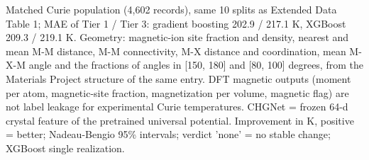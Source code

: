 \begin{table}
\par\vspace{4pt}\raggedright\noindent Matched Curie population (4,602 records), same 10 splits as Extended Data Table 1; MAE of Tier 1 / Tier 3: gradient boosting 202.9 / 217.1 K, XGBoost 209.3 / 219.1 K. Geometry: magnetic-ion site fraction and density, nearest and mean M-M distance, M-M connectivity, M-X distance and coordination, mean M-X-M angle and the fractions of angles in [150, 180] and [80, 100] degrees, from the Materials Project structure of the same entry. DFT magnetic outputs (moment per atom, magnetic-site fraction, magnetization per volume, magnetic flag) are not label leakage for experimental Curie temperatures. CHGNet = frozen 64-d crystal feature of the pretrained universal potential. Improvement in K, positive = better; Nadeau-Bengio 95\% intervals; verdict 'none' = no stable change; XGBoost single realization.
\end{table}
